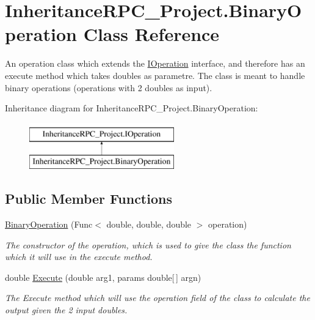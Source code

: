 \hypertarget{class_inheritance_r_p_c___project_1_1_binary_operation}{\section{Inheritance\+R\+P\+C\+\_\+\+Project.\+Binary\+Operation Class Reference}
\label{class_inheritance_r_p_c___project_1_1_binary_operation}
}


An operation class which extends the \hyperlink{interface_inheritance_r_p_c___project_1_1_i_operation}{I\+Operation} interface, and therefore has an execute method which takes doubles as parametre. The class is meant to handle binary operations (operations with 2 doubles as input).  


Inheritance diagram for Inheritance\+R\+P\+C\+\_\+\+Project.\+Binary\+Operation\+:\begin{figure}[H]
\begin{center}
\leavevmode
\includegraphics[height=2.000000cm]{class_inheritance_r_p_c___project_1_1_binary_operation}
\end{center}
\end{figure}
\subsection*{Public Member Functions}
\begin{DoxyCompactItemize}
\item 
\hyperlink{class_inheritance_r_p_c___project_1_1_binary_operation_aab4b197966243a385f884d045138c030}{Binary\+Operation} (Func$<$ double, double, double $>$ operation)
\begin{DoxyCompactList}\small\item\em The constructor of the operation, which is used to give the class the function which it will use in the execute method. \end{DoxyCompactList}\item 
double \hyperlink{class_inheritance_r_p_c___project_1_1_binary_operation_a9c344c45450b8496e1f6537b1a467a6c}{Execute} (double arg1, params double\mbox{[}$\,$\mbox{]} argn)
\begin{DoxyCompactList}\small\item\em The Execute method which will use the operation field of the class to calculate the output given the 2 input doubles. \end{DoxyCompactList}\end{DoxyCompactItemize}


